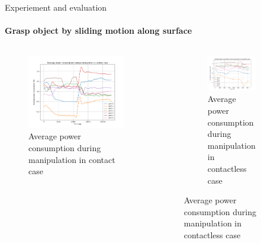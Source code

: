 \documentclass[aspectratio=169]{beamer}
\begin{document}
  \begin{frame}{Experiement and evaluation}
    \framesubtitle{Grasp object by sliding motion along surface}
    \vspace{-5mm}
    \begin{columns}[c]
      \begin{column}{.5\textwidth}
        \begin{figure}
        \includegraphics[width=1\textwidth]{images/us1_con_pow.png}
        \caption{Average power consumption during manipulation in contact case}
      \end{figure}
      \end{column}
      \begin{column}{.5\textwidth}
      \begin{figure}
        \centering
        \begin{figure}
          \includegraphics[width=1\textwidth]{images/us1_conless_pow.png}
          \caption{Average power consumption during manipulation in contactless case}
        \end{figure}
      \end{figure}
      \end{column}
      \end{columns}
  \end{frame}
\end{document}
